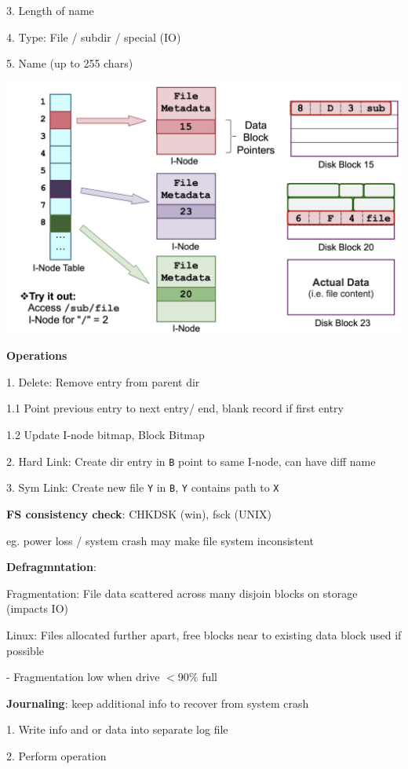 \documentclass[10pt, a4paper]{article}
\newcommand{\tab}[0]{\hspace*{2mm}}
\begin{document}
\begin{multicols*}{3}
		3. Length of name

		4. Type: File / subdir / special (IO)

		5. Name (up to 255 chars)

		\includegraphics*[scale=0.2]{./assets/ext2}

		\textbf{Operations}

		1. Delete: Remove entry from parent dir

		\tab{} 1.1 Point previous entry to next entry/ end, blank record if first entry

		\tab{} 1.2 Update I-node bitmap, Block Bitmap

		2. Hard Link: Create dir entry in \texttt{B} point to same I-node, can have diff name
		
		3. Sym Link: Create new file \texttt{Y} in \texttt{B}, \texttt{Y} contains path to \texttt{X}

		\textbf{FS consistency check}: CHKDSK (win), fsck (UNIX)

		eg. power loss / system crash may make file system inconsistent

		\textbf{Defragmntation}: 

		Fragmentation: File data scattered across many disjoin blocks on storage (impacts IO)
	
		Linux: Files allocated further apart, free blocks near to existing data block used if possible

		\tab{} - Fragmentation low when drive $<$90\% full

		\textbf{Journaling}: keep additional info to recover from system crash

		1. Write info and or data into separate log file

		2. Perform operation


\end{multicols*}
\end{document}
